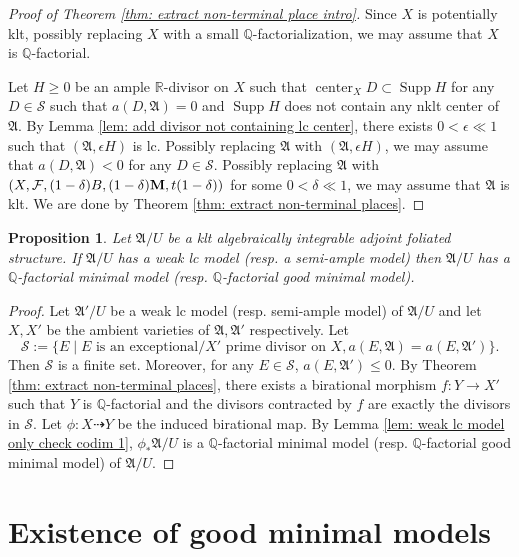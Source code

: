 \documentclass[12pt]{amsart}
\numberwithin{equation}{section}
\newcommand{\Mm}{{\bf{M}}}
\newcommand{\Rr}{\mathbb{R}}
\newcommand{\Center}{\operatorname{center}}
\newcommand{\Supp}{\operatorname{Supp}}
\newcommand{\Aa}{{\mathfrak{A}}}
\newcommand{\Ff}{\mathcal{F}}
\newtheorem{prop}[thm]{Proposition}
\theoremstyle{definition}
\theoremstyle{definition}
\theoremstyle{definition}
\begin{document}
\begin{proof}[Proof of Theorem \ref{thm: extract non-terminal place intro}]
 Since $X$ is potentially klt, possibly replacing $X$ with a small $\mathbb Q$-factorialization, we may assume that $X$ is $\mathbb Q$-factorial.
   
Let $H\geq 0$ be an ample $\Rr$-divisor on $X$ such that $\Center_XD\subset\Supp H$ for any $D\in\mathcal{S}$ such that $a(D,\Aa)=0$ and $\Supp H$ does not contain any nklt center of $\Aa$. By Lemma \ref{lem: add divisor not containing lc center}, there exists $0<\epsilon\ll 1$ such that $(\Aa,\epsilon H)$ is lc. Possibly replacing $\Aa$ with $(\Aa,\epsilon H)$, we may assume that $a(D,\Aa)<0$ for any $D\in\mathcal{S}$. Possibly replacing $\Aa$ with $(X,\Ff,(1-\delta)B,(1-\delta)\Mm,t(1-\delta))$ for some $0<\delta\ll 1$, we may assume that $\Aa$ is klt. We are done by Theorem \ref{thm: extract non-terminal places}.
\end{proof}

\begin{prop}\label{prop: eowlm implies eomm}
  Let $\Aa/U$ be a klt algebraically integrable adjoint foliated structure. If $\Aa/U$ has a weak lc model (resp. a semi-ample model) then $\Aa/U$ has a $\mathbb Q$-factorial minimal model (resp. $\mathbb Q$-factorial good minimal model).
\end{prop}
\begin{proof}
    Let $\Aa'/U$ be a weak lc model (resp. semi-ample model) of $\Aa/U$ and let $X,X'$ be the ambient varieties of $\Aa,\Aa'$ respectively. Let 
    $$\mathcal{S}:=\{E\mid E\text{ is an exceptional}/X'\text{ prime divisor on }X, a(E,\Aa)=a(E,\Aa')\}.$$
    Then $\mathcal{S}$ is a finite set. Moreover, for any $E\in\mathcal{S}$, $a(E,\Aa')\leq 0$. By Theorem \ref{thm: extract non-terminal places}, there exists a birational morphism $f: Y\rightarrow X'$ such that $Y$ is $\mathbb Q$-factorial and the divisors contracted by $f$ are exactly the divisors in $\mathcal{S}$. Let $\phi: X\dashrightarrow Y$ be the induced birational map. By Lemma \ref{lem: weak lc model only check codim 1}, $\phi_*\Aa/U$ is a $\mathbb Q$-factorial minimal model (resp. $\mathbb Q$-factorial good minimal model) of $\Aa/U$.
\end{proof}



\section{Existence of good minimal models}\label{sec: eogmm}
\end{document}
